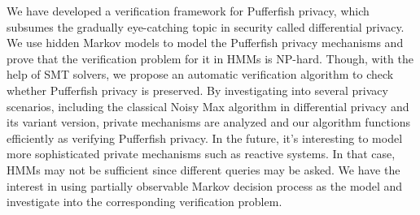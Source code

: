 
We have developed a verification framework for 
Pufferfish privacy, which subsumes
the gradually eye-catching topic in security called differential privacy.
We use hidden Markov models to model the Pufferfish privacy mechanisms and
prove that the verification problem for it in HMMs is NP-hard.
Though, with the help of SMT solvers,
we propose an automatic verification algorithm
to check whether Pufferfish privacy is preserved.
By investigating into several privacy scenarios, including the
classical Noisy Max algorithm in differential privacy and its variant version, 
private mechanisms are analyzed and our algorithm
functions efficiently as verifying Pufferfish privacy.
In the future, it's interesting to model more sophisticated
private mechanisms such as reactive systems. In that case,
HMMs may not be sufficient since
different queries may be asked.
We have the interest in using partially observable
Markov decision process as the model and investigate into
the corresponding verification problem.